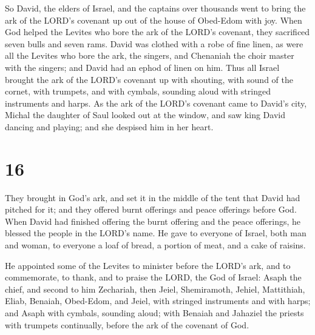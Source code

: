  So David, the elders of Israel, and the captains over
thousands went to bring the ark of the LORD's covenant up out of the
house of Obed-Edom with joy.  When God helped the Levites
who bore the ark of the LORD's covenant, they sacrificed seven bulls and
seven rams.  David was clothed with a robe of fine linen,
as were all the Levites who bore the ark, the singers, and Chenaniah the
choir master with the singers; and David had an ephod of linen on him.
 Thus all Israel brought the ark of the LORD's covenant up
with shouting, with sound of the cornet, with trumpets, and with
cymbals, sounding aloud with stringed instruments and harps.
 As the ark of the LORD's covenant came to David's city,
Michal the daughter of Saul looked out at the window, and saw king David
dancing and playing; and she despised him in her heart.

\hypertarget{section-15}{%
\section{16}\label{section-15}}

 They brought in God's ark, and set it in the middle of the
tent that David had pitched for it; and they offered burnt offerings and
peace offerings before God.  When David had finished
offering the burnt offering and the peace offerings, he blessed the
people in the LORD's name.  He gave to everyone of Israel,
both man and woman, to everyone a loaf of bread, a portion of meat, and
a cake of raisins.

 He appointed some of the Levites to minister before the
LORD's ark, and to commemorate, to thank, and to praise the LORD, the
God of Israel:  Asaph the chief, and second to him
Zechariah, then Jeiel, Shemiramoth, Jehiel, Mattithiah, Eliab, Benaiah,
Obed-Edom, and Jeiel, with stringed instruments and with harps; and
Asaph with cymbals, sounding aloud;  with Benaiah and
Jahaziel the priests with trumpets continually, before the ark of the
covenant of God.

